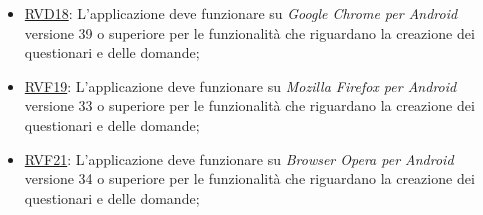 \begin{itemize}
\item \hyperlink{RVD18}{RVD18}: L’applicazione deve funzionare su \textit{Google Chrome per Android} versione 39 o superiore per le funzionalità che riguardano la creazione dei questionari e delle domande;
\item \hyperlink{RVF19}{RVF19}: L’applicazione deve funzionare su \textit{Mozilla Firefox per Android} versione 33 o superiore per le funzionalità che riguardano la creazione dei questionari e delle domande;
\item \hyperlink{RVF21}{RVF21}: L’applicazione deve funzionare su \textit{Browser Opera per Android} versione 34 o superiore per le funzionalità che riguardano la creazione dei questionari e delle domande;
\end{itemize}
